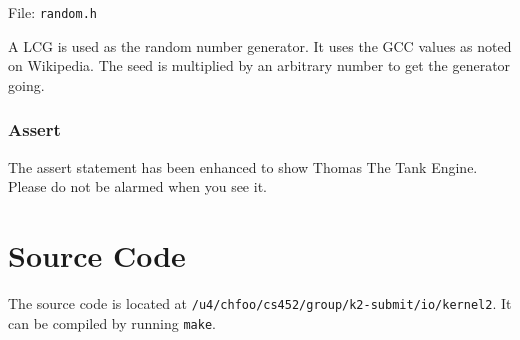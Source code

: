 \documentclass[letterpaper, 11pt]{article}
\begin{document}
File: \texttt{random.h}

A LCG is used as the random number generator. It uses the GCC values as noted on Wikipedia. The seed is multiplied by an arbitrary number to get the generator going.


\subsubsection{Assert%
  \label{assert}%
}

The assert statement has been enhanced to show Thomas The Tank Engine. Please do not be alarmed when you see it.


\section{Source Code%
  \label{source-code}%
}

The source code is located at \texttt{/u4/chfoo/cs452/group/k2-submit/io/kernel2}. It can be compiled by running \texttt{make}.
\end{document}
